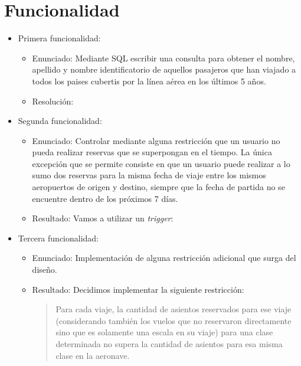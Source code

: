 \section{Funcionalidad}

\begin{itemize}
	\item Primera funcionalidad:
		\begin{itemize}
			\item Enunciado: Mediante SQL escribir una consulta para obtener el nombre, apellido y nombre
			identificatorio de aquellos pasajeros que han viajado a todos los paises cubertis por la l\'inea
			a\'erea en los \'ultimos 5 a\~nos.

			\item Resoluci\'on:

			
		\end{itemize}
	\item Segunda funcionalidad:
		\begin{itemize}
			\item Enunciado: Controlar mediante alguna restricci\'on que un usuario no pueda realizar
			reservas que se superpongan en el tiempo. La \'unica excepci\'on que se permite consiste en
			que un usuario puede realizar a lo sumo dos reservas para la misma fecha de viaje entre los
			mismos aeropuertos de origen y destino, siempre que la fecha de partida no se encuentre dentro
			de los pr\'oximos 7 d\'ias.
			\item Resultado: Vamos a utilizar un \textit{trigger}:

			
		\end{itemize}
	\item Tercera funcionalidad:
		\begin{itemize}
			\item Enunciado: Implementaci\'on de alguna restricci\'on adicional que surga del dise\~no.			
			\item Resultado: Decidimos implementar la siguiente restricci\'on:

			\begin{quotation}
				Para cada viaje, la cantidad de asientos reservados para ese viaje (considerando tambi\'en los vuelos
				que no reservaron directamente sino que es solamente una escala en su viaje) para una clase determinada 
				no supera la cantidad de asientos para esa misma clase en la aeronave.
			\end{quotation}


\end{itemize}
\end{itemize}
